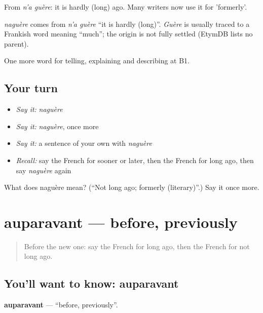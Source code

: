 From \emph{n'a guère}: it is hardly (long) ago. Many writers now use it for 'formerly'.

\begin{cousinweb}
\emph{naguère} comes from \emph{n'a guère} \textquotedblleft{}it is hardly (long)\textquotedblright{}. \emph{Guère} is usually traced to a Frankish word meaning \textquotedblleft{}much\textquotedblright{}; the origin is not fully settled (EtymDB lists no parent).
\end{cousinweb}

\begin{grammarlens}[title={What you've built}]
One more word for telling, explaining and describing at B1.
\end{grammarlens}

\subsection*{Your turn}
\begin{itemize}
\raggedright
  \item \emph{Say it:} \emph{naguère}
  \item \emph{Say it:} \emph{naguère}, once more
  \item \emph{Say it:} a sentence of your own with \emph{naguère}
  \item \emph{Recall:} say the French for sooner or later, then the French for long ago, then say \emph{naguère} again
\end{itemize}

\begin{tcolorbox}[breakable,colback=teal!4,colframe=teal!35!black,title={Before you move on}]
What does naguère mean? (\textquotedblleft{}Not long ago; formerly (literary)\textquotedblright{}.) Say it once more.
\end{tcolorbox}
\section[auparavant]{auparavant — before, previously}

\label{lesson:FR-C272-auparavant}



\begin{quote}
Before the new one: say the French for long ago, then the French for not long ago.
\end{quote}

\subsection*{You'll want to know: auparavant}
\textbf{auparavant} — \textquotedblleft{}before, previously\textquotedblright{}.

